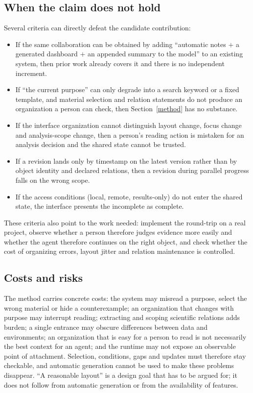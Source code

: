 \documentclass[11pt]{article}
\begin{document}
\subsection{When the claim does not hold}\label{falsify}

Several criteria can directly defeat the candidate contribution:

\begin{itemize}
  \item If the same collaboration can be obtained by adding ``automatic notes $+$ a generated dashboard $+$ an appended summary to the model'' to an existing system, then prior work already covers it and there is no independent increment.
  \item If ``the current purpose'' can only degrade into a search keyword or a fixed template, and material selection and relation statements do not produce an organization a person can check, then Section~\ref{method} has no substance.
  \item If the interface organization cannot distinguish layout change, focus change and analysis-scope change, then a person's reading action is mistaken for an analysis decision and the shared state cannot be trusted.
  \item If a revision lands only by timestamp on the latest version rather than by object identity and declared relations, then a revision during parallel progress falls on the wrong scope.
  \item If the access conditions (local, remote, results-only) do not enter the shared state, the interface presents the incomplete as complete.
\end{itemize}

These criteria also point to the work needed: implement the round-trip on a real project, observe whether a person therefore judges evidence more easily and whether the agent therefore continues on the right object, and check whether the cost of organizing errors, layout jitter and relation maintenance is controlled.

\subsection{Costs and risks}\label{costs}

The method carries concrete costs: the system may misread a purpose, select the wrong material or hide a counterexample; an organization that changes with purpose may interrupt reading; extracting and scoping scientific relations adds burden; a single entrance may obscure differences between data and environments; an organization that is easy for a person to read is not necessarily the best context for an agent; and the runtime may not expose an observable point of attachment. Selection, conditions, gaps and updates must therefore stay checkable, and automatic generation cannot be used to make these problems disappear. ``A reasonable layout'' is a design goal that has to be argued for; it does not follow from automatic generation or from the availability of features.
\end{document}
